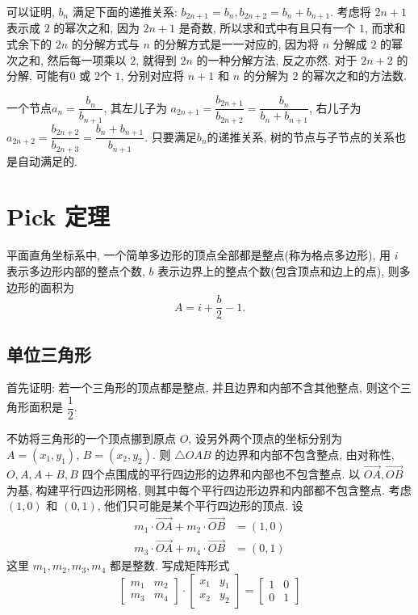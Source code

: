 可以证明, $b_n$ 满足下面的递推关系: $b_{2n+1} = b_n, b_{2n+2} = b_n+b_{n+1}$. 考虑将 $2n+1$ 表示成 $2$ 的幂次之和, 因为 $2n+1$ 是奇数, 所以求和式中有且只有一个 $1$, 而求和式余下的 $2n$ 的分解方式与 $n$ 的分解方式是一一对应的, 因为将 $n$ 分解成 $2$ 的幂次之和, 然后每一项乘以 $2$, 就得到 $2n$ 的一种分解方法, 反之亦然. 对于 $2n+2$ 的分解, 可能有$0$ 或 $2$个 $1$, 分别对应将 $n+1$ 和 $n$ 的分解为 $2$ 的幂次之和的方法数.

一个节点$a_n = \dfrac{b_n}{b_{n+1}}$, 其左儿子为 $a_{2n+1} = \dfrac{b_{2n+1}}{b_{2n+2}} = \dfrac{b_n}{b_n+b_{n+1}}$, 右儿子为 $a_{2n+2} = \dfrac{b_{2n+2}}{b_{2n+3}} = \dfrac{b_n+b_{n+1}}{b_{n+1}}$. 只要满足$b_n$的递推关系, 树的节点与子节点的关系也是自动满足的.


\newpage
\section{Pick 定理}
平面直角坐标系中, 一个简单多边形的顶点全部都是整点(称为格点多边形), 用 $i$ 表示多边形内部的整点个数, $b$ 表示边界上的整点个数(包含顶点和边上的点), 则多边形的面积为
\[ A = i + \frac{b}{2} - 1.\]

\subsection{单位三角形}
首先证明: 若一个三角形的顶点都是整点, 并且边界和内部不含其他整点, 则这个三角形面积是 $\dfrac{1}{2}$.

不妨将三角形的一个顶点挪到原点 $O$, 设另外两个顶点的坐标分别为 $A = (x_1,y_1)$, $B = (x_2,y_2)$. 则 $\triangle OAB$ 的边界和内部不包含整点, 由对称性, $O,A,A+B,B$ 四个点围成的平行四边形的边界和内部也不包含整点. 以 $\vec{OA}, \vec{OB}$ 为基, 构建平行四边形网格, 则其中每个平行四边形边界和内部都不包含整点. 
考虑 $(1,0)$ 和 $(0,1)$, 他们只可能是某个平行四边形的顶点. 设
\begin{align*}
m_1\cdot \vec{OA} + m_2\cdot \vec{OB} &= (1,0) \\
m_3\cdot \vec{OA} + m_4\cdot \vec{OB} &= (0,1)
\end{align*}
这里 $m_1,m_2,m_3,m_4$ 都是整数. 写成矩阵形式
\[
\begin{bmatrix}
m_1 & m_2 \\
m_3 & m_4
\end{bmatrix} \cdot
\begin{bmatrix}
x_1 & y_1 \\
x_2 & y_2
\end{bmatrix} =
\begin{bmatrix}
1 & 0 \\
0 & 1
\end{bmatrix} 
\]

